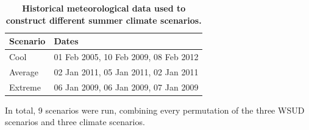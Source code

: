 \documentclass[final,3p,times,authoryear]{elsarticle}
\begin{document}
\begin{table}[!htbp]
\caption{\bf Historical meteorological data used to construct different summer climate scenarios.  \label{tab:dates}}     
\begin{tabular}{ l l}
\textbf{Scenario} & \textbf{Dates}\\ \hline
Cool & 01 Feb 2005, 10 Feb 2009, 08 Feb 2012 \\ 
Average & 02 Jan 2011, 05 Jan 2011, 02 Jan 2011 \\ 
Extreme & 06 Jan 2009, 06 Jan 2009, 07 Jan 2009 \\ 
\hline
\end{tabular}
\end{table}

In total, 9 scenarios were run, combining every permutation of the three WSUD scenarios and three climate scenarios.
\end{document}
